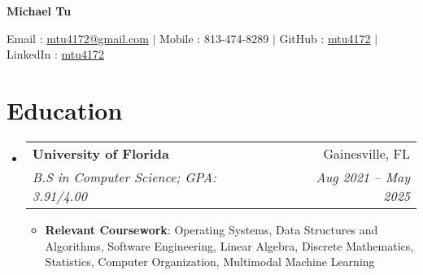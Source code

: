 \documentclass[letterpaper,11pt]{article}
\makeatletter
\newcommand{\resumeItem}[2]{
  \item\small{
    \textbf{#1}{: #2 \vspace{-2pt}}
  }
}
\newcommand{\resumeSubheading}[4]{
  \vspace{-1pt}\item
    \begin{tabular*}{0.97\textwidth}{l@{\extracolsep{\fill}}r}
      \textbf{#1} & #2 \\
      \textit{\small#3} & \textit{\small #4} \\
    \end{tabular*}\vspace{-6pt}
}
\newcommand{\resumeSubHeadingListStart}{\begin{itemize}[leftmargin=*, label={}]}
\newcommand{\resumeSubHeadingListEnd}{\end{itemize}}
\newcommand{\resumeItemListStart}{\begin{itemize}}
\newcommand{\resumeItemListEnd}{\end{itemize}\vspace{-5pt}}
\makeatother
\begin{document}
    \centerline{\textbf{\huge Michael Tu}}\vspace{0.15cm}
    \centerline{Email : \href{mailto:}{mtu4172@gmail.com} $|$
    Mobile : 813-474-8289 $|$
    GitHub : \href{http://github.com/mtu4172}{mtu4172} $|$
    LinkedIn : \href{http://linkedin.com/in/mtu4172}{mtu4172}}

\section{Education}
  \resumeSubHeadingListStart
    \resumeSubheading
      {University of Florida}{Gainesville, FL}
      {B.S in Computer Science; GPA: 3.91/4.00}{Aug 2021 -- May 2025}
    \resumeItemListStart
        \resumeItem{Relevant Coursework}
            {Operating Systems,
            Data Structures and Algorithms, 
            Software Engineering, 
            Linear Algebra, 
            Discrete Mathematics, 
            Statistics, 
            Computer Organization,
            Multimodal Machine Learning
            }
    \resumeItemListEnd
  \resumeSubHeadingListEnd

\end{document}
